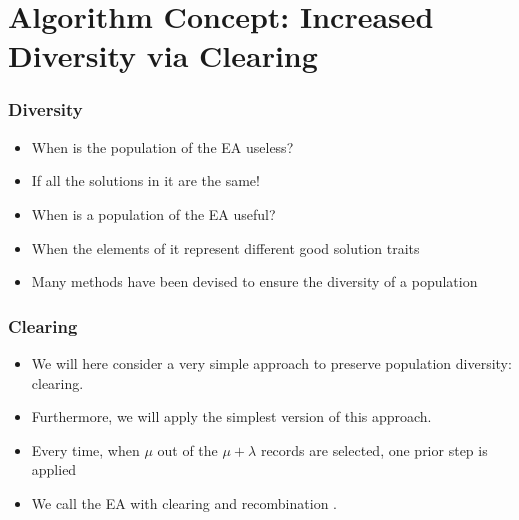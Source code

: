 \documentclass[mathserif]{beamer}%
\begin{document}
\section{Algorithm Concept: Increased Diversity via Clearing}%
%
\begin{frame}%
\frametitle{Diversity}%
\begin{itemize}%
\item When is the population of the EA useless?%
\item<2-> If all the solutions in it are the same!%
\item<3-> When is a population of the EA useful?%
\item<4-> When the elements of it represent different good solution traits%
\item<6-> Many methods have been devised to ensure the diversity of a population%
\end{itemize}%
\end{frame}%
%
%
\begin{frame}%
\frametitle{Clearing}%
\begin{itemize}%
\item We will here consider a very simple approach to preserve population diversity: \alert{clearing}\cite{S2012NIEA,FHN2007RAOSDM}.%
\item<2-> Furthermore, we will apply the simplest version of this approach.%
\item<3-> Every time, when $\mu$ out of the $\mu+\lambda$ records are selected, one prior step is applied%
\item<5-> We call the EA with clearing and recombination .%
\end{itemize}%
\end{frame}%
%
\end{document}
